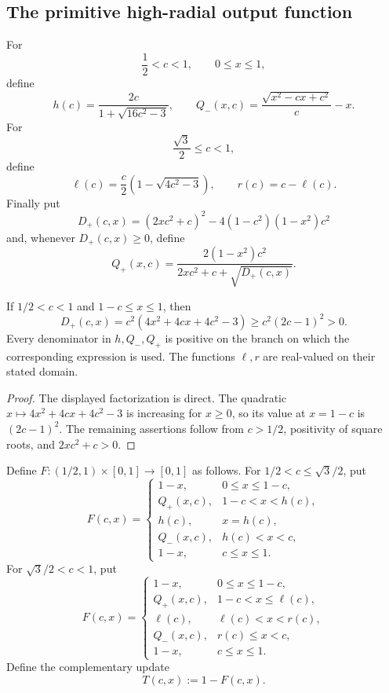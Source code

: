 \subsection{The primitive high-radial output function}

For
\[
 \frac12<c<1,\qquad 0\le x\le1,
\]
define
\[
 h(c)=\frac{2c}{1+\sqrt{16c^2-3}},
 \qquad
 Q_-(x,c)=\frac{\sqrt{x^2-cx+c^2}}{c}-x.
\]
For
\[
 \frac{\sqrt3}{2}\le c<1,
\]
define
\[
 \ell(c)=\frac c2\left(1-\sqrt{4c^2-3}\right),
 \qquad
 r(c)=c-\ell(c).
\]
Finally put
\[
 D_+(c,x)
 =(2xc^2+c)^2-4(1-c^2)(1-x^2)c^2
\]
and, whenever \(D_+(c,x)\ge0\), define
\[
 Q_+(x,c)=
 \frac{2(1-x^2)c^2}
 {2xc^2+c+\sqrt{D_+(c,x)}}.
\]

\begin{lemma}
\label{lem:s2-pure-map-well-defined}
If \(1/2<c<1\) and \(1-c\le x\le1\), then
\[
 D_+(c,x)
 =c^2\left(4x^2+4cx+4c^2-3\right)
 \ge c^2(2c-1)^2>0.
\]
Every denominator in \(h,Q_-,Q_+\) is positive on the branch on which the
corresponding expression is used.  The functions \(\ell,r\) are real-valued on
their stated domain.
\end{lemma}

\begin{proof}
The displayed factorization is direct.  The quadratic
\(x\mapsto4x^2+4cx+4c^2-3\) is increasing for \(x\ge0\), so its value at
\(x=1-c\) is \((2c-1)^2\).  The remaining assertions follow from
\(c>1/2\), positivity of square roots, and \(2xc^2+c>0\).
\end{proof}

\begin{definition}
\label{def:s2-pure-map}
Define \(F:(1/2,1)\times[0,1]\to[0,1]\) as follows.  For
\(1/2<c\le\sqrt3/2\), put
\[
 F(c,x)=
 \begin{cases}
  1-x,&0\le x\le1-c,\\
  Q_+(x,c),&1-c<x<h(c),\\
  h(c),&x=h(c),\\
  Q_-(x,c),&h(c)<x<c,\\
  1-x,&c\le x\le1.
 \end{cases}
\]
For \(\sqrt3/2<c<1\), put
\[
 F(c,x)=
 \begin{cases}
  1-x,&0\le x\le1-c,\\
  Q_+(x,c),&1-c<x\le \ell(c),\\
  \ell(c),&\ell(c)<x<r(c),\\
  Q_-(x,c),&r(c)\le x<c,\\
  1-x,&c\le x\le1.
 \end{cases}
\]
Define the complementary update
\[
 T(c,x):=1-F(c,x).
\]
\end{definition}

